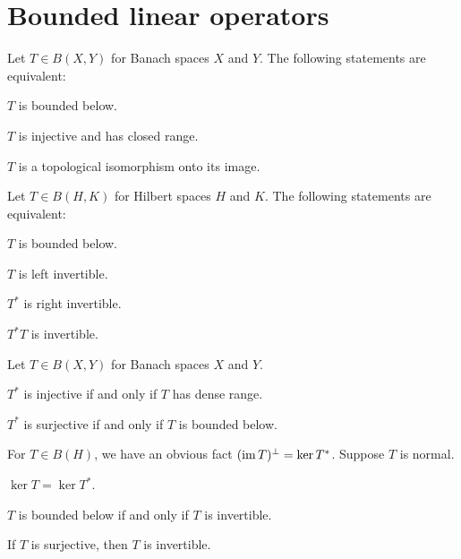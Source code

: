 \documentclass{../../large}
\begin{document}
\chapter{Bounded linear operators}
\begin{prb}
Let $T\in B(X,Y)$ for Banach spaces $X$ and $Y$.
The following statements are equivalent:
\begin{parts}
\item $T$ is bounded below.
\item $T$ is injective and has closed range.
\item $T$ is a topological isomorphism onto its image.
\end{parts}
\end{prb}

\begin{prb}
Let $T\in B(H,K)$ for Hilbert spaces $H$ and $K$.
The following statements are equivalent:
\begin{parts}
\item $T$ is bounded below.
\item $T$ is left invertible.
\item $T^*$ is right invertible.
\item $T^*T$ is invertible.
\end{parts}
\end{prb}

\begin{prb}
Let $T\in B(X,Y)$ for Banach spaces $X$ and $Y$.
\begin{parts}
\item $T^*$ is injective if and only if $T$ has dense range.
\item $T^*$ is surjective if and only if $T$ is bounded below.
\end{parts}
\end{prb}

\begin{prb}
For $T\in B(H)$, we have an obvious fact $(\operatorname{im} T)^\perp=\ker T^*$.
Suppose $T$ is normal.
\begin{parts}
\item $\ker T=\ker T^*$.
\item $T$ is bounded below if and only if $T$ is invertible.
\item If $T$ is surjective, then $T$ is invertible.
\end{parts}
\end{prb}
\end{document}
